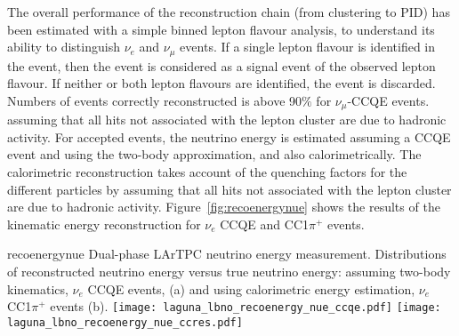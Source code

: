 The overall performance of the reconstruction chain (from clustering to PID) has been estimated with a simple binned lepton flavour analysis, 
to understand its ability to distinguish $\nu_{e}$ and $\nu_{\mu}$ events.
If a single lepton flavour is identified in the event, then the event is considered as a signal event of the observed lepton flavour. 
If neither or both lepton flavours are identified, the event is discarded.
Numbers of events correctly reconstructed is above 90$\%$ for $\nu_{\mu}$-CCQE events.
assuming that all hits not associated with the lepton cluster are due to hadronic activity.
For accepted events, the neutrino energy is estimated  assuming a CCQE event and using the two-body approximation, and also calorimetrically.
The calorimetric reconstruction takes account of the quenching factors for the different particles by 
assuming that all hits not associated with the lepton cluster are due to hadronic activity.
Figure~\ref{fig:recoenergynue} shows the results of the kinematic energy reconstruction for $\nu_e$ CCQE and CC1$\pi^{+}$ events.

\begin{cdrfigure}{recoenergynue}
{Dual-phase LArTPC neutrino energy measurement. Distributions of reconstructed neutrino energy versus true neutrino energy: assuming two-body kinematics,  $\nu_{e}$ CCQE events, (a) 
and using calorimetric energy estimation, $\nu_{e}$  CC1$\pi^{+}$ events (b).}
\texttt{[image: laguna\_lbno\_recoenergy\_nue\_ccqe.pdf]}
\texttt{[image: laguna\_lbno\_recoenergy\_nue\_ccres.pdf]}
\end{cdrfigure}





